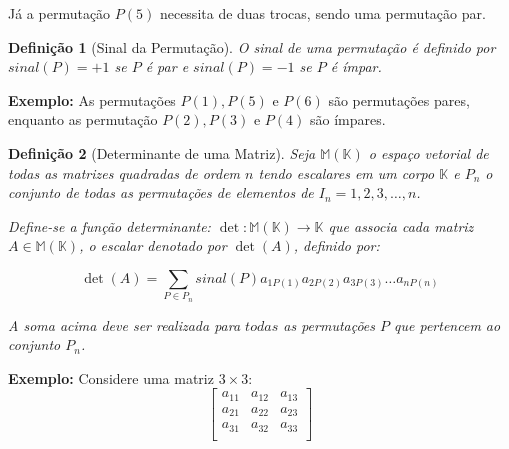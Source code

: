 \documentclass[oneside,a4paper,12pt]{article}
\newtheorem{definition}{Definição}[section]
\begin{document}
Já a permutação $P(5)$ necessita de duas trocas, sendo uma permutação par.

\begin{definition}[Sinal da Permutação]
	O sinal de uma permutação é definido por $sinal(P)=+1$ se $P$ é par e $sinal(P)=-1$ se $P$ é ímpar.
\end{definition}

\textbf{Exemplo: } As permutações $P(1), P(5)$ e $P(6)$ são permutações pares, enquanto as permutação $P(2),P(3)$ e $P(4)$ são ímpares.

\begin{definition}[Determinante de uma Matriz]
	Seja $\mathbb{M}(\mathbb{K})$ o espaço vetorial de todas as matrizes quadradas de ordem $n$ tendo escalares em um corpo $\mathbb{K}$ e $P_n$ o conjunto de todas as permutações de elementos de $I_n={1,2,3,\dots,n}$.
	
	Define-se a função determinante: $\det:\mathbb{M}(\mathbb{K}) \rightarrow \mathbb{K}$ que associa cada matriz $A \in\mathbb{M}(\mathbb{K})$, o escalar denotado por $\det(A)$, definido por:	
	
	$$\det(A) = \sum_{P \in P_{n}} sinal(P) a_{1P(1)}a_{2P(2)}a_{3P(3)}\dots a_{nP(n)}$$
	
	A soma acima deve ser realizada para $todas$ as permutações $P$ que pertencem ao conjunto $P_n$.
\end{definition}

\textbf{Exemplo: } Considere uma matriz $3 \times 3$:
$$
\left[
\begin{array}{ccc}
a_{11}	&	a_{12}		&	a_{13}	\\
a_{21}	&	a_{22}		&	a_{23}	\\
a_{31}	&	a_{32}		&	a_{33}	\\
\end{array}
\right]
$$
\end{document}

